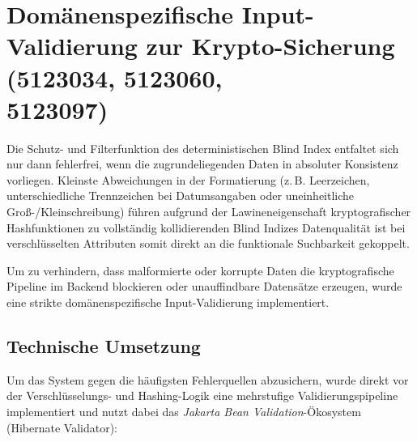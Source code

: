 \section{Domänenspezifische Input-Validierung zur Krypto-Sicherung (5123034, 5123060, \\5123097)}

Die Schutz- und Filterfunktion des deterministischen Blind Index entfaltet sich nur dann fehlerfrei, wenn die zugrundeliegenden Daten in absoluter 
Konsistenz vorliegen. Kleinste Abweichungen in der Formatierung (z.\,B. Leerzeichen, unterschiedliche Trennzeichen 
bei Datumsangaben oder uneinheitliche Groß-/Kleinschreibung) führen aufgrund der Lawineneigenschaft kryptografischer Hashfunktionen zu vollständig 
kollidierenden Blind Indizes Datenqualität ist bei verschlüsselten Attributen somit direkt an die funktionale Suchbarkeit gekoppelt. 

Um zu verhindern, dass malformierte oder korrupte Daten die kryptografische Pipeline im Backend blockieren oder unauffindbare Datensätze erzeugen, 
wurde eine strikte domänenspezifische Input-Validierung implementiert. 

\subsection{Technische Umsetzung}

Um das System gegen die häufigsten Fehlerquellen abzusichern, wurde direkt vor der Verschlüsselungs- und Hashing-Logik eine mehrstufige Validierungspipeline 
implementiert und nutzt dabei das \textit{Jakarta Bean Validation}-Ökosystem (Hibernate Validator):

